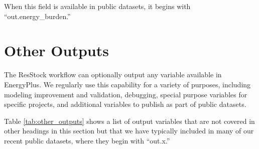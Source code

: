 When this field is available in public datasets, it begins with ``out.energy\_burden.''
\section{Other Outputs}
The ResStock workflow can optionally output any variable available in EnergyPlus. We regularly use this capability for a variety of purposes, including modeling improvement and validation, debugging, special purpose variables for specific projects, and additional variables to publish as part of public datasets. 

Table \ref{tab:other_outputs} shows a list of output variables that are not covered in other headings in this section but that we have typically included in many of our recent public datasets, where they begin with ``out.x.''

